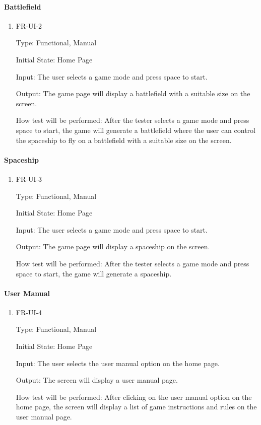 \documentclass[12pt, titlepage]{article}
\begin{document}
\paragraph{Battlefield}

\begin{enumerate}					
\item{FR-UI-2\\}

Type: Functional, Manual
					
Initial State: Home Page
					
Input: The user selects a game mode and press space to start.
					
Output: The game page will display a battlefield with a suitable size on the screen.
					
How test will be performed: After the tester selects a game mode and press space to start, the game will generate a battlefield where the user can control the spaceship to fly on a battlefield with a suitable size on the screen.

\end{enumerate}

\paragraph{Spaceship}
\begin{enumerate}					
\item{FR-UI-3\\}

Type: Functional, Manual
					
Initial State: Home Page
					
Input: The user selects a game mode and press space to start.
					
Output: The game page will display a spaceship on the screen.
					
How test will be performed:  After the tester selects a game mode and press space to start, the game will generate a spaceship.

\end{enumerate}

\paragraph{User Manual}
\begin{enumerate}					
\item{FR-UI-4\\}

Type: Functional, Manual
					
Initial State: Home Page
					
Input: The user selects the user manual option on the home page.
					
Output: The screen will display a user manual page.
					
How test will be performed:  After clicking on the user manual option on the home page, the screen will display a list of game instructions and rules on the user manual page.

\end{enumerate}
\end{document}
